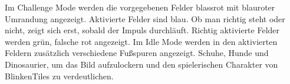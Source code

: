Im Challenge Mode werden die vorgegebenen Felder blassrot mit blauroter Umrandung angezeigt. Aktivierte Felder sind blau. Ob man richtig steht oder nicht, zeigt sich erst, sobald der Impuls durchläuft. Richtig aktivierte Felder werden grün, falsche rot angezeigt. Im Idle Mode werden in den aktivierten Feldern zusätzlich verschiedene Fußspuren angezeigt. Schuhe, Hunde und Dinosaurier, um das Bild aufzulockern und den spielerischen Charakter von BlinkenTiles zu verdeutlichen.






